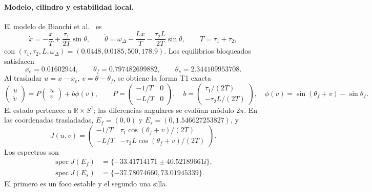 \paragraph{Modelo, cilindro y estabilidad local.}
El modelo de Bianchi et al.~\cite{pll2015} es
\begin{equation}
 \dot x=-\frac{x}{T}+\frac{\tau_1}{2T}\sin\theta,
 \qquad
 \dot\theta=\omega_\Delta-\frac{Lx}{T}
 -\frac{\tau_2L}{2T}\sin\theta,
 \qquad T=\tau_1+\tau_2,
 \label{ncbench:eq:pll-original}
\end{equation}
con \((\tau_1,\tau_2,L,\omega_\Delta)=(0.0448,0.0185,500,178.9)\).
Los equilibrios bloqueados satisfacen
\begin{equation}
 x_e=0.01602944,\qquad
 \theta_f=0.797482699882,\qquad
 \theta_s=2.344109953708.
 \label{ncbench:eq:pll-equilibria}
\end{equation}
Al trasladar \(u=x-x_e\), \(v=\theta-\theta_f\), se obtiene la forma T1
exacta
\begin{equation}
 \begin{pmatrix}\dot u\\\dot v\end{pmatrix}
 =P\begin{pmatrix}u\\v\end{pmatrix}+b\phi(v),\qquad
 P=\begin{pmatrix}-1/T&0\\-L/T&0\end{pmatrix},\quad
 b=\begin{pmatrix}\tau_1/(2T)\\-\tau_2L/(2T)\end{pmatrix},
 \quad \phi(v)=\sin(\theta_f+v)-\sin\theta_f.
 \label{ncbench:eq:pll-lure}
\end{equation}
El estado pertenece a \(\mathbb R\times S^1\); las diferencias angulares se
evalúan módulo \(2\pi\). En las coordenadas trasladadas,
\(E_f=(0,0)\) y \(E_s=(0,1.546627253827)\), y
\begin{equation}
 J(u,v)=\begin{pmatrix}
 -1/T&\tau_1\cos(\theta_f+v)/(2T)\\
 -L/T&-\tau_2L\cos(\theta_f+v)/(2T)
 \end{pmatrix}.
 \label{ncbench:eq:pll-jacobian}
\end{equation}
Los espectros son
\begin{align}
 \operatorname{spec}J(E_f)&=
 \{-33.41714171\pm40.52189661\ii\},\\
 \operatorname{spec}J(E_s)&=\{-37.78074660,73.01945339\}.
\end{align}
El primero es un foco estable y el segundo una silla.

